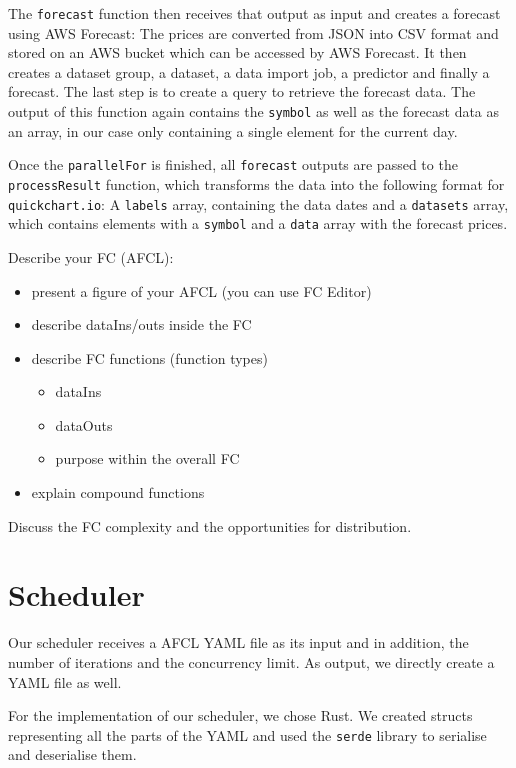 The \texttt{forecast} function then receives that output as input and creates a
forecast using AWS Forecast: The prices are converted from JSON into CSV format
and stored on an AWS bucket which can be accessed by AWS Forecast. It then creates
a dataset group, a dataset, a data import job, a predictor and finally a forecast.
The last step is to create a query to retrieve the forecast data. The output of
this function again contains the \texttt{symbol} as well as the forecast data
as an array, in our case only containing a single element for the current day.

Once the \texttt{parallelFor} is finished, all \texttt{forecast} outputs are passed
to the \texttt{processResult} function, which transforms the data into the following
format for \texttt{quickchart.io}: A \texttt{labels} array, containing the data dates
and a \texttt{datasets} array, which contains elements with a \texttt{symbol} and a
\texttt{data} array with the forecast prices.

Describe your FC (AFCL):
\begin{itemize}
    \item present a figure of your AFCL (you can use FC Editor)
    \item describe dataIns/outs inside the FC
    \item describe FC functions (function types)
    \begin{itemize}
        \item dataIns
        \item dataOuts
        \item purpose within the overall FC
    \end{itemize}
    \item explain compound functions
\end{itemize}

Discuss the FC complexity and the opportunities for distribution.



%
%
%
\section{Scheduler}

Our scheduler receives a AFCL YAML file as its input and in addition, the number of iterations and the concurrency limit.
As output, we directly create a YAML file as well.

For the implementation of our scheduler, we chose Rust. We created structs representing all the parts of the YAML and
used the \texttt{serde} library to serialise and deserialise them.

